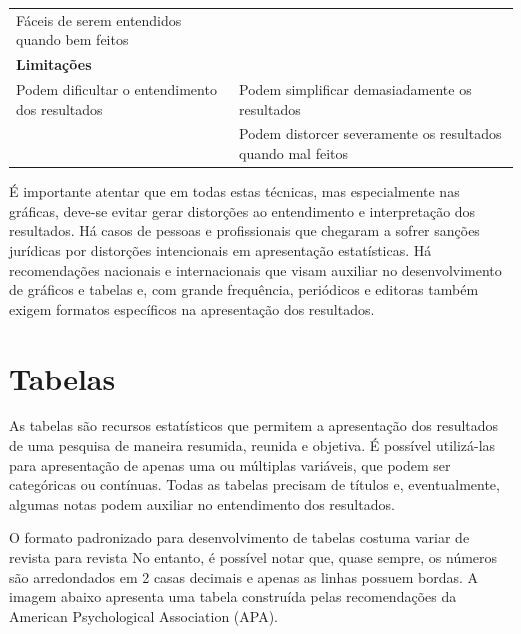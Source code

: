 \documentclass[
]{book}
\begin{document}
\begin{longtable}[]{@{}ll@{}}
\begin{minipage}[t]{0.47\columnwidth}
Fáceis de serem entendidos quando bem feitos\strut
\end{minipage}\tabularnewline
\begin{minipage}[t]{0.47\columnwidth}\raggedright
\textbf{Limitações}\strut
\end{minipage} & \begin{minipage}[t]{0.47\columnwidth}\raggedright
\strut
\end{minipage}\tabularnewline
\begin{minipage}[t]{0.47\columnwidth}\raggedright
Podem dificultar o entendimento dos resultados\strut
\end{minipage} & \begin{minipage}[t]{0.47\columnwidth}\raggedright
Podem simplificar demasiadamente os resultados\strut
\end{minipage}\tabularnewline
\begin{minipage}[t]{0.47\columnwidth}\raggedright
\strut
\end{minipage} & \begin{minipage}[t]{0.47\columnwidth}\raggedright
Podem distorcer severamente os resultados quando mal feitos\strut
\end{minipage}\tabularnewline
\bottomrule
\end{longtable}

É importante atentar que em todas estas técnicas, mas especialmente nas
gráficas, deve-se evitar gerar distorções ao entendimento e
interpretação dos resultados. Há casos de pessoas e profissionais que
chegaram a sofrer sanções jurídicas por distorções intencionais em
apresentação estatísticas. Há recomendações nacionais e internacionais
que visam auxiliar no desenvolvimento de gráficos e tabelas e, com
grande frequência, periódicos e editoras também exigem formatos
específicos na apresentação dos resultados.

\hypertarget{tabelas}{%
\section{Tabelas}\label{tabelas}}

As tabelas são recursos estatísticos que permitem a apresentação dos
resultados de uma pesquisa de maneira resumida, reunida e objetiva. É
possível utilizá-las para apresentação de apenas uma ou múltiplas
variáveis, que podem ser categóricas ou contínuas. Todas as tabelas
precisam de títulos e, eventualmente, algumas notas podem auxiliar no
entendimento dos resultados.

O formato padronizado para desenvolvimento de tabelas costuma variar de
revista para revista No entanto, é possível notar que, quase sempre, os
números são arredondados em 2 casas decimais e apenas as linhas possuem
bordas. A imagem abaixo apresenta uma tabela construída pelas
recomendações da American Psychological Association (APA).
\end{document}
